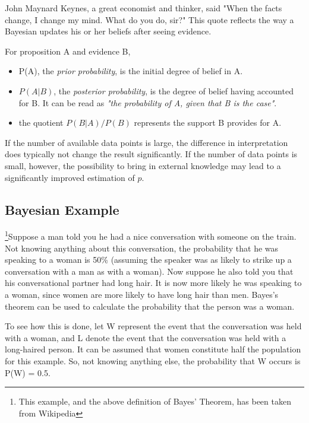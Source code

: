 John Maynard Keynes, a great economist and thinker, said "When the facts change, I change my mind. What do you do, sir?" This quote reflects the way a Bayesian updates his or her beliefs after seeing evidence.

For proposition A and evidence B,

\begin{itemize}
  \item P(A), the \emph{prior probability}, is the initial degree of belief in A.
  \item $P(A|B)$, the \emph{posterior probability}, is the degree of belief having accounted for B. It can be read as \emph{"the probability of A, given that B is the case"}.
  \item the quotient $P(B|A)/P(B)$ represents the support B provides for A.
\end{itemize}

If the number of available data points is large, the difference in interpretation does typically not change the result significantly. If the number of data points is small, however, the possibility to bring in external knowledge may lead to a significantly improved estimation of $p$.

\subsection{Bayesian Example}

\footnote{This example, and the above definition of Bayes' Theorem, has been taken from Wikipedia}Suppose a man told you he had a nice conversation with someone on the train. Not knowing anything about this conversation, the probability that he was speaking to a woman is 50\% (assuming the speaker was as likely to strike up a conversation with a man as with a woman). Now suppose he also told you that his conversational partner had long hair. It is now more likely he was speaking to a woman, since women are more likely to have long hair than men. Bayes's theorem can be used to calculate the probability that the person was a woman.

To see how this is done, let W represent the event that the conversation was held with a woman, and L denote the event that the conversation was held with a long-haired person. It can be assumed that women constitute half the population for this example. So, not knowing anything else, the probability that W occurs is P(W) = 0.5.

